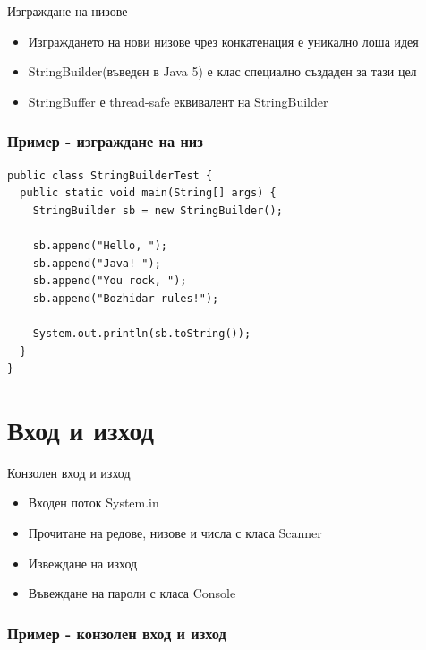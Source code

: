 \documentclass{beamer}
\begin{document}
\begin{frame}{Изграждане на низове}
  \transdissolve
  \begin{itemize}
  \item Изграждането на нови низове чрез конкатенация е уникално лоша
    идея
  \item StringBuilder(въведен в Java 5) е клас специално създаден за тази цел
  \item StringBuffer е thread-safe еквивалент на StringBuilder
  \end{itemize}
\end{frame}

\begin{frame}[fragile]
  \frametitle{Пример - изграждане на низ}
  \transdissolve
\begin{lstlisting}
public class StringBuilderTest {
  public static void main(String[] args) {
    StringBuilder sb = new StringBuilder();

    sb.append("Hello, ");
    sb.append("Java! ");
    sb.append("You rock, ");
    sb.append("Bozhidar rules!");

    System.out.println(sb.toString());
  }
}  
\end{lstlisting}
\end{frame}

\section{Вход и изход}
\begin{frame}{Конзолен вход и изход}
  \transdissolve
  \begin{itemize}
  \item Входен поток System.in
  \item Прочитане на редове, низове и числа с класа Scanner
  \item Извеждане на изход
  \item Въвеждане на пароли с класа Console
  \end{itemize}
\end{frame}

\begin{frame}[fragile]
  \frametitle{Пример - конзолен вход и изход}
  \transdissolve
\begin{lstlisting}
  
\end{lstlisting}
\end{frame}
\end{document}
